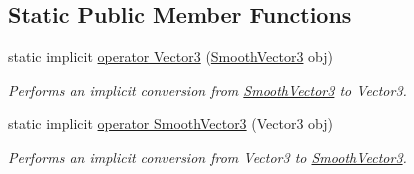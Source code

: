 \subsection*{Static Public Member Functions}
\begin{DoxyCompactItemize}
\item 
static implicit \hyperlink{class_radical_library_1_1_smooth_vector3_a988fe9c1a29aa3ff9780f0df95b93c5b}{operator Vector3} (\hyperlink{class_radical_library_1_1_smooth_vector3}{Smooth\+Vector3} obj)
\begin{DoxyCompactList}\small\item\em Performs an implicit conversion from \hyperlink{class_radical_library_1_1_smooth_vector3}{Smooth\+Vector3} to Vector3. \end{DoxyCompactList}\item 
static implicit \hyperlink{class_radical_library_1_1_smooth_vector3_a2483e5c896cdd26188d13554cc7c5078}{operator Smooth\+Vector3} (Vector3 obj)
\begin{DoxyCompactList}\small\item\em Performs an implicit conversion from Vector3 to \hyperlink{class_radical_library_1_1_smooth_vector3}{Smooth\+Vector3}. \end{DoxyCompactList}\end{DoxyCompactItemize}
